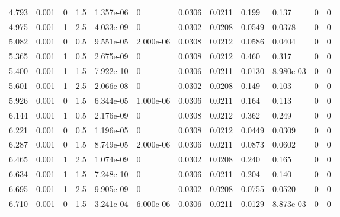 \documentclass[preview]{standalone}
\begin{document}
{{\begin{tabular}{L{1.2cm}C{1.2cm} C{0.3cm}C{0.5cm} C{1.4cm}C{1.4cm} C{1.4cm}C{1.4cm} C{1.6cm}C{1.6cm} C{1.6cm}C{1.6cm}}
  4.793  &  0.001  & 0     & 1.5 &  1.357e-06  & 0  &  0.0306&   0.0211& 0.199 & 0.137   &  0 & 0  \\ 
  4.975  &  0.001  & 1     & 2.5 &  4.033e-09  & 0  &  0.0302&   0.0208& 0.0549 & 0.0378   &  0 & 0  \\ 
  5.082  &  0.001  & 0     & 0.5 &  9.551e-05  & 2.000e-06  &  0.0308&   0.0212& 0.0586 & 0.0404   &  0 & 0  \\ 
  5.365  &  0.001  & 1     & 0.5 &  2.675e-09  & 0  &  0.0308&   0.0212& 0.460 & 0.317   &  0 & 0  \\ 
  5.400  &  0.001  & 1     & 1.5 &  7.922e-10  & 0  &  0.0306&   0.0211& 0.0130 & 8.980e-03   &  0 & 0  \\ 
  5.601  &  0.001  & 1     & 2.5 &  2.066e-08  & 0  &  0.0302&   0.0208& 0.149 & 0.103   &  0 & 0  \\ 
  5.926  &  0.001  & 0     & 1.5 &  6.344e-05  & 1.000e-06  &  0.0306&   0.0211& 0.164 & 0.113   &  0 & 0  \\ 
  6.144  &  0.001  & 1     & 0.5 &  2.176e-09  & 0  &  0.0308&   0.0212& 0.362 & 0.249   &  0 & 0  \\ 
  6.221  &  0.001  & 0     & 0.5 &  1.196e-05  & 0  &  0.0308&   0.0212& 0.0449 & 0.0309   &  0 & 0  \\ 
  6.287  &  0.001  & 0     & 1.5 &  8.749e-05  & 2.000e-06  &  0.0306&   0.0211& 0.0873 & 0.0602   &  0 & 0  \\ 
  6.465  &  0.001  & 1     & 2.5 &  1.074e-09  & 0  &  0.0302&   0.0208& 0.240 & 0.165   &  0 & 0  \\ 
  6.634  &  0.001  & 1     & 1.5 &  7.248e-10  & 0  &  0.0306&   0.0211& 0.204 & 0.140   &  0 & 0  \\ 
  6.695  &  0.001  & 1     & 2.5 &  9.905e-09  & 0  &  0.0302&   0.0208& 0.0755 & 0.0520   &  0 & 0  \\ 
  6.710  &  0.001  & 0     & 1.5 &  3.241e-04  & 6.000e-06  &  0.0306&   0.0211& 0.0129 & 8.873e-03   &  0 & 0  \\ 
\hline 
\end{tabular} 

}}
\end{document}
